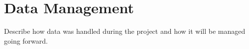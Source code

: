 \section{Data Management}


Describe how data was handled during the project and how it will be managed going forward.

